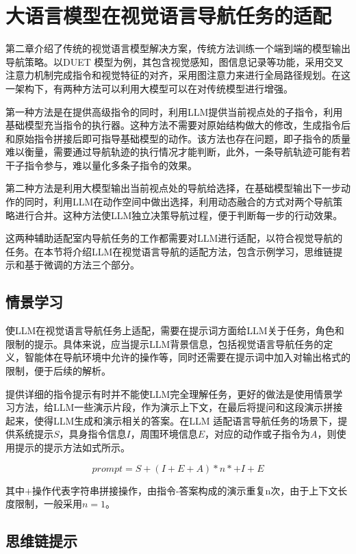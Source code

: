 \documentclass[bachelor]{thesis-uestc}
\begin{document}
\section{大语言模型在视觉语言导航任务的适配}

第二章介绍了传统的视觉语言模型解决方案，传统方法训练一个端到端的模型输出导航策略。以DUET 模型为例，其包含视觉感知，图信息记录等功能，采用交叉注意力机制完成指令和视觉特征的对齐，采用图注意力来进行全局路径规划。在这一架构下，有两种方法可以利用大模型可以在对传统模型进行增强。

第一种方法是在提供高级指令的同时，利用LLM提供当前视点处的子指令，利用基础模型充当指令的执行器。这种方法不需要对原始结构做大的修改，生成指令后和原始指令拼接后即可指导基础模型的动作。该方法也存在问题，即子指令的质量难以衡量，需要通过导航轨迹的执行情况才能判断，此外，一条导航轨迹可能有若干子指令参与，难以量化多条子指令的效果。

第二种方法是利用大模型输出当前视点处的导航给选择，在基础模型输出下一步动作的同时，利用LLM在动作空间中做出选择，利用动态融合的方式对两个导航策略进行合并。这种方法使LLM独立决策导航过程，便于判断每一步的行动效果。

这两种辅助适配室内导航任务的工作都需要对LLM进行适配，以符合视觉导航的任务。在本节将介绍LLM在视觉语言导航的适配方法，包含示例学习，思维链提示和基于微调的方法三个部分。

\subsection{情景学习}

使LLM在视觉语言导航任务上适配，需要在提示词方面给LLM关于任务，角色和限制的提示。具体来说，应当提示LLM背景信息，包括视觉语言导航任务的定义，智能体在导航环境中允许的操作等，同时还需要在提示词中加入对输出格式的限制，便于后续的解析。

提供详细的指令提示有时并不能使LLM完全理解任务，更好的做法是使用情景学习方法，给LLM一些演示片段，作为演示上下文，在最后将提问和这段演示拼接起来，使得LLM生成和演示相关的答案。在LLM 适配语言导航任务的场景下，提供系统提示$S$，具身指令信息$I$，周围环境信息$E$，对应的动作或子指令为$A$，则使用提示的提示方法如式所示。

\begin{equation}
    prompt=S+(I+E+A)*n*+I+E
\label{icl}
\end{equation}

其中$+$操作代表字符串拼接操作，由指令-答案构成的演示重复n次，由于上下文长度限制，一般采用$n=1$。

\subsection{思维链提示}
\end{document}
